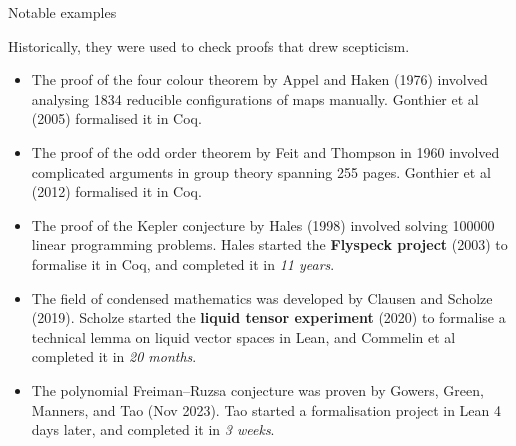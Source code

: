 \documentclass[10pt]{beamer}
\begin{document}
\begin{frame}[t]{Notable examples}

Historically, they were used to check proofs that drew scepticism.

\pause

\begin{itemize}
\item The proof of the four colour theorem by Appel and Haken (1976) involved analysing 1834 reducible configurations of maps manually. Gonthier et al (2005) formalised it in Coq.

\pause

\item The proof of the odd order theorem by Feit and Thompson in 1960 involved complicated arguments in group theory spanning 255 pages. Gonthier et al (2012) formalised it in Coq.

\pause

\item The proof of the Kepler conjecture by Hales (1998) involved solving 100000 linear programming problems. Hales started the \textbf{Flyspeck project} (2003) to formalise it in Coq, and completed it in \emph{11 years}.

\pause

\item The field of condensed mathematics was developed by Clausen and Scholze (2019). Scholze started the \textbf{liquid tensor experiment} (2020) to formalise a technical lemma on liquid vector spaces in Lean, and Commelin et al completed it in \emph{20 months}.

\pause

\item The polynomial Freiman--Ruzsa conjecture was proven by Gowers, Green, Manners, and Tao (Nov 2023). Tao started a formalisation project in Lean 4 days later, and completed it in \emph{3 weeks}.
\end{itemize}

\end{frame}
\end{document}
